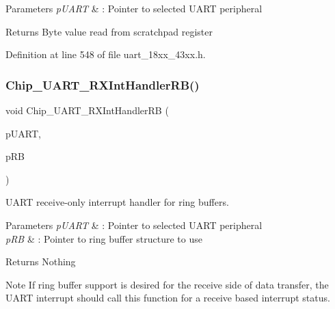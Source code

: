 \begin{DoxyParams}{Parameters}
{\em p\+U\+A\+RT} & \+: Pointer to selected U\+A\+RT peripheral \\
\hline
\end{DoxyParams}
\begin{DoxyReturn}{Returns}
Byte value read from scratchpad register 
\end{DoxyReturn}


Definition at line 548 of file uart\+\_\+18xx\+\_\+43xx.\+h.

\mbox{\label{group___u_a_r_t__18_x_x__43_x_x_gafdd19a312a2bed6ff1ccb47d5b68c248}} 
\subsubsection{\texorpdfstring{Chip\+\_\+\+U\+A\+R\+T\+\_\+\+R\+X\+Int\+Handler\+R\+B()}{Chip\_UART\_RXIntHandlerRB()}}
{\footnotesize\ttfamily void Chip\+\_\+\+U\+A\+R\+T\+\_\+\+R\+X\+Int\+Handler\+RB (\begin{DoxyParamCaption}\item[{\hyperlink{struct_l_p_c___u_s_a_r_t___t}{L\+P\+C\+\_\+\+U\+S\+A\+R\+T\+\_\+T} $\ast$}]{p\+U\+A\+RT,  }\item[{\hyperlink{struct_r_i_n_g_b_u_f_f___t}{R\+I\+N\+G\+B\+U\+F\+F\+\_\+T} $\ast$}]{p\+RB }\end{DoxyParamCaption})}



U\+A\+RT receive-\/only interrupt handler for ring buffers. 


\begin{DoxyParams}{Parameters}
{\em p\+U\+A\+RT} & \+: Pointer to selected U\+A\+RT peripheral \\
\hline
{\em p\+RB} & \+: Pointer to ring buffer structure to use \\
\hline
\end{DoxyParams}
\begin{DoxyReturn}{Returns}
Nothing 
\end{DoxyReturn}
\begin{DoxyNote}{Note}
If ring buffer support is desired for the receive side of data transfer, the U\+A\+RT interrupt should call this function for a receive based interrupt status. 
\end{DoxyNote}


